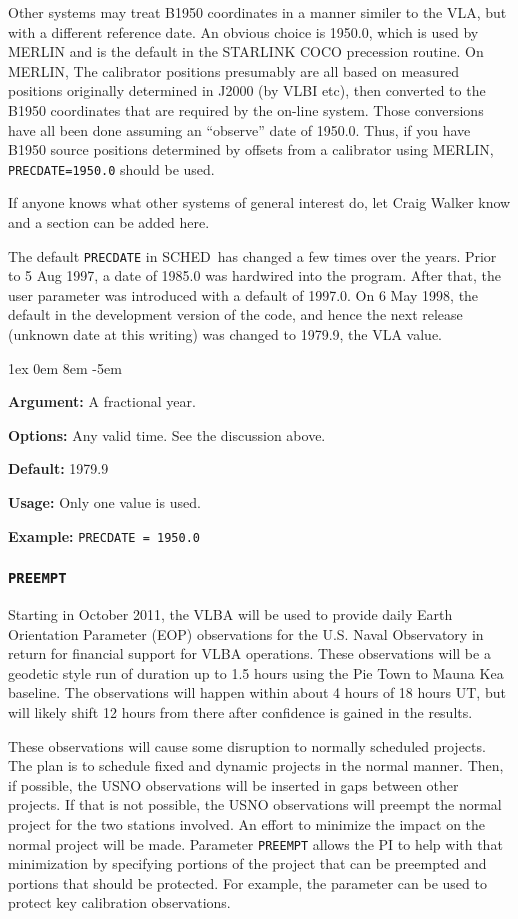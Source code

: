 \documentclass{report}
\newcommand{\schedb}{{\sc SCHED~}}
\newcommand{\rcwbox}[5]{
  \begin{list}{}{\parsep 1ex  \itemsep 0em
                 \leftmargin 8em  \itemindent -5em }
    \item {\bf Argument:} #1
    \item {\bf Options:}  #2
    \item {\bf Default:}  #3
    \item {\bf Usage:}    #4
    \item {\bf Example:}  #5
  \end{list}
}
\begin{document}
Other systems may treat B1950 coordinates in a manner similer to the
VLA, but with a different reference date.  An obvious choice is
1950.0, which is used by MERLIN and is the default in the STARLINK
COCO precession routine.  On MERLIN, The calibrator positions
presumably are all based on measured positions originally determined
in J2000 (by VLBI etc), then converted to the B1950 coordinates that
are required by the on-line system.  Those conversions have all been
done assuming an ``observe'' date of 1950.0.  Thus, if you have B1950
source positions determined by offsets from a calibrator using MERLIN,
{\tt PRECDATE=1950.0} should be used.

If anyone knows what other systems of general interest do, let
Craig Walker know and a section can be added here.

The default {\tt PRECDATE} in \schedb has changed a few times over the
years.  Prior to 5 Aug 1997, a date of 1985.0 was hardwired into
the program.  After that, the user parameter was introduced with a
default of 1997.0.  On 6 May 1998, the default in the development
version of the code, and hence the next release (unknown date at this
writing) was changed to 1979.9, the VLA value.

\rcwbox
{A fractional year.}
{Any valid time.  See the discussion above.}
{1979.9}
{Only one value is used.}
{{\tt PRECDATE = 1950.0}}

\subsubsection{\label{MP:PREEMPT}{\tt PREEMPT}}

Starting in October 2011, the VLBA will be used to provide daily
Earth Orientation Parameter (EOP) observations for the U.S. Naval
Observatory in return for financial support for VLBA operations.
These observations will be a geodetic style run of duration up to
1.5 hours using the Pie Town to Mauna Kea baseline.  The observations
will happen within about 4 hours of 18 hours UT, but will likely
shift 12 hours from there after confidence is gained in the results.

These observations will cause some disruption to normally scheduled
projects.  The plan is to schedule fixed and dynamic projects in the
normal manner.  Then, if possible, the USNO observations will be
inserted in gaps between other projects.  If that is not possible,
the USNO observations will preempt the normal project for the two
stations involved. An effort to minimize the impact on the normal
project will be made.  Parameter {\tt PREEMPT} allows the PI to
help with that minimization by specifying portions of the project
that can be preempted and portions that should be protected.  For
example, the parameter can be used to protect key calibration
observations.
\end{document}

